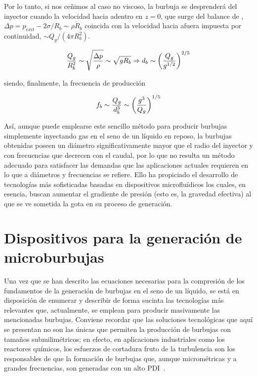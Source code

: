 Por lo tanto, si nos ceñimos al caso no viscoso, la burbuja se desprenderá del inyector cuando la velocidad hacia adentro en $z = 0$, que surge del balance de , $\Delta p = p_{exit} - 2\sigma/R_{b} \sim \rho \dot{R}_{b}$ coincida con la velocidad hacia afuera impuesta por continuidad, $\sim Q_{g}/\left(4\pi R_{b}^{2}\right)$.

\begin{equation}\LABEQ{dbestimado}
\dfrac{Q_{g}}{R_{b}^{2}} \sim 	\sqrt{\dfrac{\Delta p}{\rho}} \sim \sqrt{g R_{b}} \Rightarrow d_{b} \sim \left(\dfrac{Q_{g}}{g^{1/2}}\right)^{2/5}
\end{equation}

siendo, finalmente, la frecuencia de producción 

\begin{equation}\LABEQ{fbestimado}
f_{b}\sim \dfrac{Q_{g}}{d_{b}^{3}} \sim	\left(\dfrac{g^{3}}{Q_{g}}\right)^{1/5}
\end{equation}

Así, aunque puede emplearse este sencillo método para producir burbujas simplemente inyectando gas en el seno de un líquido en reposo, la burbujas obtenidas poseen un diámetro significativamente mayor que el radio del inyector y con frecuencias que decrecen con el caudal, por lo que no resulta un método adecuado para satisfacer las demandas que las aplicaciones actuales requieren en lo que a diámetros y frecuencias se refiere\cite{Rodriguez-Rodriguez2015b}. Ello ha propiciado el desarrollo de tecnologías más sofisticadas basadas en dispositivos microfluídicos los cuales, en esencia, buscan aumentar el gradiente de presión (esto es, la gravedad efectiva) al que se ve sometida la gota en su proceso de generación. 




\section{Dispositivos para la generación de microburbujas}


Una vez que se han descrito las ecuaciones necesarias para la compresión de los fundamentos de la generación de burbujas en el seno de un líquido, se está en disposición de enumerar y describir de forma sucinta las tecnologías más relevantes que, actualmente, se emplean para producir masivamente las mencionadas burbujas. Conviene recordar que las soluciones tecnológicas que aquí se presentan no son las únicas que permiten la producción de burbujas con tamaños submilimétricos; en efecto, en aplicaciones industriales como los reactores químicos, los esfuerzos de cortadura fruto de la turbulencia son los responsables de que la formación de burbujas que, aunque micrométricas y a grandes frecuencias, son generadas con un alto PDI~\cite{Rodriguez-Rodriguez2015b}.

